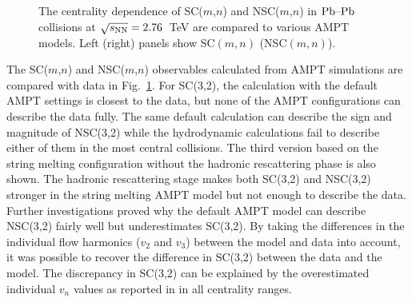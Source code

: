  \begin{figure}[!]
	\begin{center}
        \caption{The centrality dependence of SC($m$,$n$) and NSC($m$,$n$) in $\textnormal{Pb--Pb}$ collisions at $\sqrt{s_{\textnormal{NN}}}=2.76$~TeV are compared to various AMPT models. Left (right) panels show SC$(m,n)$ (NSC$(m,n)$).}
        \label{fig:Figure_5}
        \end{center}   
 \end{figure}
 
The SC($m$,$n$) and NSC($m$,$n$) observables calculated from AMPT simulations are compared with data in Fig.~\ref{fig:Figure_5}.
For SC(3,2), the calculation with the default AMPT settings is closest to the data, but none of the AMPT configurations can describe the data fully. 
The same default calculation can describe the sign and magnitude of NSC(3,2) while the hydrodynamic calculations fail to describe either of them in the most central collisions.
The third version based on the string melting configuration without the hadronic rescattering phase is also shown.
The hadronic rescattering stage makes both SC(3,2) and NSC(3,2) stronger in the string melting AMPT model but not enough to describe the data.
Further investigations proved why the default AMPT model can describe NSC(3,2) fairly well but underestimates SC(3,2). By taking the differences in the individual flow harmonics ($v_2$ and $v_3$) between the model and data into account, it was possible to recover the difference in SC(3,2) between the data and the model. The discrepancy in SC(3,2) can be explained by the overestimated individual $v_n$ values as reported in \cite{Adam:2016nfo} in all centrality ranges. 

